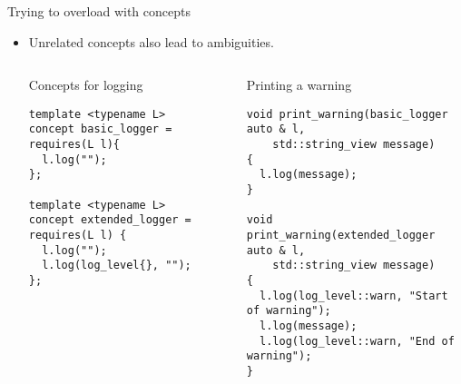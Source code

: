 \begin{frame}[t,fragile]{Trying to overload with concepts}
\begin{itemize}
  \item Unrelated concepts also lead to ambiguities.

\begin{columns}[T]

\begin{block}{Concepts for logging}
\begin{lstlisting}
template <typename L>
concept basic_logger = requires(L l){
  l.log("");
};

template <typename L>
concept extended_logger = requires(L l) {
  l.log("");
  l.log(log_level{}, "");
};
\end{lstlisting}
\end{block}

\begin{block}{Printing a warning}
\begin{lstlisting}
void print_warning(basic_logger auto & l, 
    std::string_view message)
{
  l.log(message);
}

void print_warning(extended_logger auto & l, 
    std::string_view message)
{
  l.log(log_level::warn, "Start of warning");
  l.log(message);
  l.log(log_level::warn, "End of warning");
}
\end{lstlisting}
\end{block}
\end{columns}

\end{itemize}
\end{frame}


